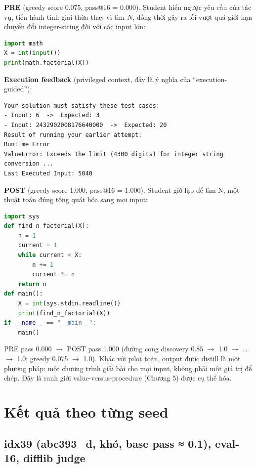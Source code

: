 \textbf{PRE} (greedy score 0.075, pass@16 = 0.000). Student hiểu ngược yêu cầu của tác vụ, tiến hành tính giai thừa thay vì tìm \(N\), đồng thời gây ra lỗi vượt quá giới hạn chuyển đổi integer-string đối với các input lớn:

\begin{lstlisting}[language=Python]
import math
X = int(input())
print(math.factorial(X))
\end{lstlisting}

\textbf{Execution feedback} (privileged context, đây là ý nghĩa của ``execution-guided''):

\begin{lstlisting}
Your solution must satisfy these test cases:
- Input: 6  ->  Expected: 3
- Input: 2432902008176640000  ->  Expected: 20
Result of running your earlier attempt:
Runtime Error
ValueError: Exceeds the limit (4300 digits) for integer string conversion ...
Last Executed Input: 5040
\end{lstlisting}

\textbf{POST} (greedy score 1.000, pass@16 = 1.000). Student giờ lặp để tìm N, một thuật toán đúng tổng quát hóa sang mọi input:

\begin{lstlisting}[language=Python]
import sys
def find_n_factorial(X):
    n = 1
    current = 1
    while current < X:
        n += 1
        current *= n
    return n
def main():
    X = int(sys.stdin.readline())
    print(find_n_factorial(X))
if __name__ == "__main__":
    main()
\end{lstlisting}

PRE pass 0.000 $\rightarrow$ POST pass 1.000 (đường cong discovery 0.85 $\rightarrow$ 1.0 $\rightarrow$ \ldots{} $\rightarrow$ 1.0; greedy 0.075 $\rightarrow$ 1.0). Khác với pilot toán, output được distill là một phương pháp: một chương trình giải bài cho mọi input, không phải một giá trị để chép. Đây là ranh giới value-versus-procedure (Chương 5) được cụ thể hóa.

\chapter{Kết quả theo từng seed}\label{appendix-e-per-seed-results}

\section{idx39 (abc393\_d, khó, base pass ≈ 0.1), eval-16, difflib judge}\label{e.1-idx39-abc393_d-hard-base-pass-0.1-eval-16-difflib-judge}

